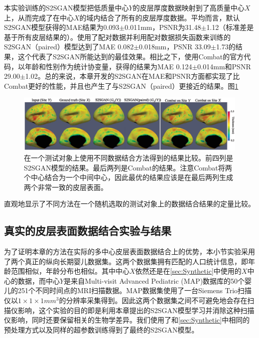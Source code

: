 本实验训练的S2SGAN模型把低质量中心$Y$的皮层厚度数据映射到了高质量中心$X$上，从而完成了在中心$X$的域内结合了所有的皮层厚度数据。平均而言，默认S2SGAN模型获得的MAE结果为0.093$\pm$0.011mm，PSNR为31.48$\pm$1.12（标准差是基于所有皮层结果的）。使用了配对数据并利用配对数据损失函数来训练的S2SGAN（paired）模型达到了MAE 0.082$\pm$0.018mm，PSNR 33.09$\pm$1.73的结果，这个代表了S2SGAN所能达到的最佳效果。相比之下，使用Combat的官方代码，以年龄和性别作为统计协变量，获得的结果为MAE 0.124$\pm$0.014mm和PSNR 29.00$\pm$1.02。总的来说，本章开发的S2SGAN在MAE和PSNR方面都实现了比Combat更好的性能，并且也产生了与S2SGAN（paired）更接近的结果。图\ref{fig:s2sgan_paired_result}
\begin{figure}[h]
	\centering
	\includegraphics[width=\linewidth]{figure/s2sgan_paired_result.eps}
	\caption{在一个测试对象上使用不同数据结合方法得到的结果比较。前四列是S2SGAN模型的结果。最后两列是Combat的结果。注意Combat将两个中心结合为一个中间中心，因此最优的结果应该是在最后两列生成两个非常一致的皮层表面。}\label{fig:s2sgan_paired_result} 
\end{figure} 
直观地显示了不同方法在一个随机选取的测试对象上的数据结合结果的定量比较。


\subsection{真实的皮层表面数据结合实验与结果}
为了证明本章的方法在实际的多中心皮层表面数据结合上的优势，本小节实验采用了两个真正的纵向长期婴儿数据集。这两个数据集拥有匹配的人口统计信息，即年龄范围相似，年龄分布也相似。其中中心$X$依然还是在\ref{sec:Synthetic}中使用的$X$中心的数据，而中心$Y$是来自Multi-visit Advanced Pediatric (MAP)数据库的50个婴儿的251个不同时间点的MRI扫描数据。MAP数据集使用了一台Siemens Trio扫描仪以$1\times 1\times 1mm^3$的分辨率采集得到。因此这两个数据集之间不可避免地会存在扫描仪影响，这个实验的目的即是利用本章提出的S2SGAN模型学习并消除这种扫描仪影响，同时还要保留相关的生物学差异。我们使用了和\ref{sec:Synthetic}中相同的预处理方式以及同样的超参数训练得到了最终的S2SGAN模型。




